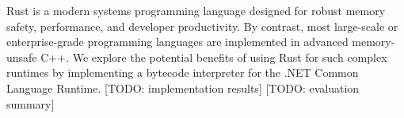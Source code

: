 Rust is a modern systems programming language designed for robust memory safety, performance, and developer productivity.
By contrast, most large-scale or enterprise-grade programming languages are implemented in advanced memory-unsafe C++.
We explore the potential benefits of using Rust for such complex runtimes by implementing a bytecode interpreter
for the .NET Common Language Runtime.
[TODO: implementation results] [TODO: evaluation summary]

